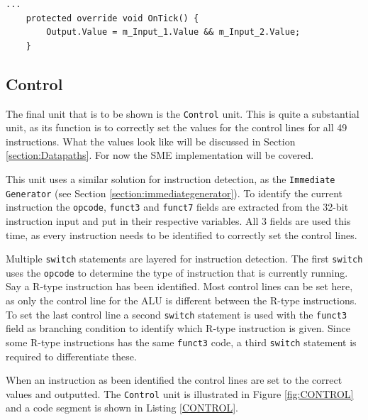         \begin{minipage}{\linewidth}
            \begin{lstlisting}[language={[Sharp]C}, caption={A slice of the \texttt{AND gate} process SME code. It simply calculates the logical AND of two input and outputs the result.},captionpos=b, label = AND]
...
    protected override void OnTick() {
        Output.Value = m_Input_1.Value && m_Input_2.Value;
    }
            \end{lstlisting}
        \end{minipage} 
        
    \subsection{Control}
        The final unit that is to be shown is the \texttt{Control} unit. This is quite a substantial unit, as its function is to correctly set the values for the control lines for all 49 instructions. What the values look like will be discussed in Section \ref{section:Datapaths}. For now the SME implementation will be covered.
        
        This unit uses a similar solution for instruction detection, as the \texttt{Immediate Generator} (see Section \ref{section:immediategenerator}). To identify the current instruction the \texttt{opcode}, \texttt{funct3} and \texttt{funct7} fields are extracted from the 32-bit instruction input and put in their respective variables. All 3 fields are used this time, as every instruction needs to be identified to correctly set the control lines.
        
        Multiple \texttt{switch} statements are layered for instruction detection. The first \texttt{switch} uses the \texttt{opcode} to determine the type of instruction that is currently running. Say a R-type instruction has been identified. Most control lines can be set here, as only the control line for the ALU is different between the R-type instructions. To set the last control line a second \texttt{switch} statement is used with the \texttt{funct3} field as branching condition to identify which R-type instruction is given. Since some R-type instructions has the same \texttt{funct3} code, a third \texttt{switch} statement is required to differentiate these.
        
        When an instruction as been identified the control lines are set to the correct values and outputted. The \texttt{Control} unit is illustrated in Figure \ref{fig:CONTROL} and a code segment is shown in Listing \ref{CONTROL}.
        
